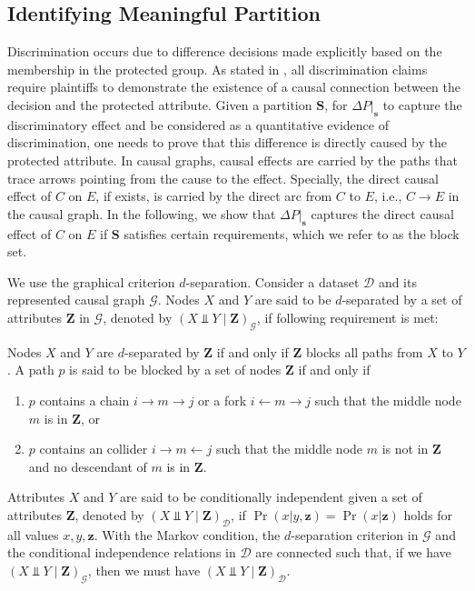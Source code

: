 \documentclass[twoside,leqno,twocolumn]{article}
\begin{document}
\subsection{Identifying Meaningful Partition}
Discrimination occurs due to difference decisions made explicitly based on the membership in the protected group. As stated in \cite{foster2004causation}, all discrimination claims require plaintiffs to demonstrate the existence of a causal connection between the decision and the protected attribute. Given a partition $\mathbf{S}$, for $\Delta P|_{\mathbf{s}}$ to capture the discriminatory effect and be considered as a quantitative evidence of discrimination, one needs to prove that this difference is directly caused by the protected attribute. 
In causal graphs, causal effects are carried by the paths that trace arrows pointing from the cause to the effect. Specially, the direct causal effect of $C$ on $E$, if exists, is carried by the direct arc from $C$ to $E$, i.e., $C \rightarrow E$ in the causal graph. In the following, we show that $\Delta P|_{\mathbf{s}}$ captures the direct causal effect of $C$ on $E$ if $\mathbf{S}$ satisfies certain requirements, which we refer to as the block set.

We use the graphical criterion $d$-separation. Consider a dataset $\mathcal{D}$ and its represented causal graph $\mathcal{G}$. Nodes $X$ and $Y$ are said to be $d$-separated by a set of attributes $\mathbf{Z}$ in $\mathcal{G}$, denoted by $(X\Perp Y \mid \mathbf{Z})_{\mathcal{G}}$, if following requirement is met:
\begin{Definition}\label{def:d}
Nodes $X$ and $Y$ are $d$-separated by $\mathbf{Z}$ if and only if $\mathbf{Z}$ blocks all paths from $X$ to $Y$. A path $p$ is said to be blocked by a set of nodes $\mathbf{Z}$ if and only if
\begin{enumerate}
	\item $p$ contains a chain $i\rightarrow m\rightarrow j$ or a fork $i\leftarrow m \rightarrow j$ such that the middle node $m$ is in $\mathbf{Z}$, or
	\item $p$ contains an collider $i\rightarrow m\leftarrow j$ such that the middle node $m$ is not in $\mathbf{Z}$ and no descendant of $m$ is in $\mathbf{Z}$.
\end{enumerate}
\end{Definition}
Attributes $X$ and $Y$ are said to be conditionally independent given a set of attributes $\mathbf{Z}$, denoted by $(X\Perp Y \mid \mathbf{Z})_{\mathcal{D}}$, if $\Pr(x|y,\mathbf{z})=\Pr(x|\mathbf{z})$ holds for all values $x,y,\mathbf{z}$. With the Markov condition, the $d$-separation criterion in $\mathcal{G}$ and the conditional independence relations in $\mathcal{D}$ are connected such that, if we have $(X\Perp Y \mid \mathbf{Z})_{\mathcal{G}}$, then we must have $(X\Perp Y \mid \mathbf{Z})_{\mathcal{D}}$.
\end{document}
